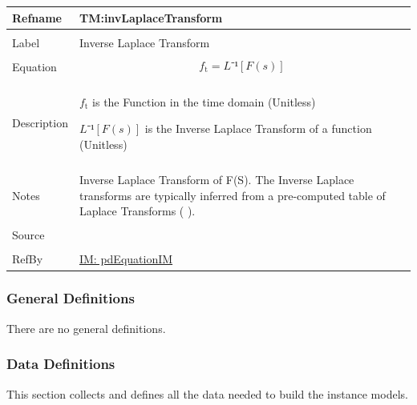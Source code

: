 \documentclass[12pt]{article}
\begin{document}
\noindent
\begin{minipage}{\textwidth}
\begin{tabular}{>{\raggedright}p{}>{\raggedright\arraybackslash}p{}}
\toprule \textbf{Refname} & \textbf{TM:invLaplaceTransform}
\label{TM:invLaplaceTransform}
\\ \midrule \\
Label & Inverse Laplace Transform
        
\\ \midrule \\
Equation & \begin{displaymath}
           {f_{\text{t}}}=L⁻¹[F(s)]
           \end{displaymath}
\\ \midrule \\
Description & \begin{symbDescription}
              \item{${f_{\text{t}}}$ is the Function in the time domain (Unitless)}
              \item{$L⁻¹[F(s)]$ is the Inverse Laplace Transform of a function (Unitless)}
              \end{symbDescription}
\\ \midrule \\
Notes & Inverse Laplace Transform of F(S). The Inverse Laplace transforms are  typically inferred from a pre-computed table of Laplace Transforms  ( \cite{laplaceWiki} ).
        
\\ \midrule \\
Source & \cite{laplaceWiki}
         
\\ \midrule \\
RefBy & \hyperref[IM:pdEquationIM]{IM: pdEquationIM}
        
\\ \bottomrule
\end{tabular}
\end{minipage}
\subsubsection{General Definitions}
\label{Sec:GDs}
There are no general definitions.

\subsubsection{Data Definitions}
\label{Sec:DDs}
This section collects and defines all the data needed to build the instance models.
\end{document}

